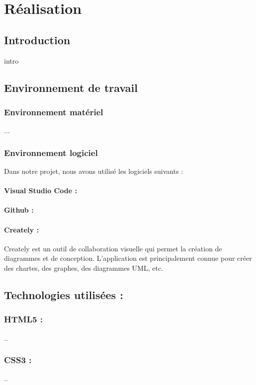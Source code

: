 \chapter{Réalisation}

\section{Introduction}
intro

\section{Environnement de travail}

\subsection{Environnement matériel }
...


\subsection{Environnement logiciel}
Dans notre projet, nous avons utilisé les logiciels suivants : 
\subsubsection{Visual Studio Code :}
 
 \subsubsection{Github :}


\subsubsection{Creately :}

Creately est un outil de collaboration visuelle qui permet la création de diagrammes et de conception.
L'application est principalement connue pour créer des chartes, des graphes, des diagrammes UML, etc.


\section{Technologies utilisées :}


\subsection{HTML5 :}
..

\subsection{CSS3 :}
..


